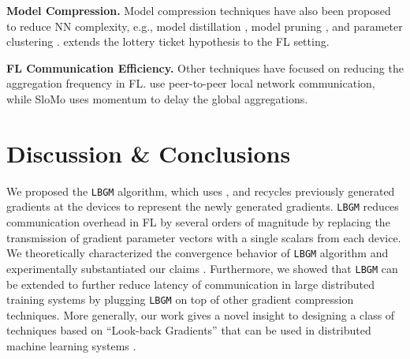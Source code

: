\documentclass{article}
\newcommand{\shams}[1]{{\color{red}{#1}}}
\renewcommand{\shams}[1]{{\color{black}{#1}}}
\newcommand{\algName}{{\tt LBGM}}
\begin{document}
\vspace{-1.2mm}
\textbf{Model Compression.} Model compression techniques have also been proposed to reduce NN complexity, e.g., model distillation \citep{ba2013deep, hinton2015distilling}, model pruning \citep{lecun1990optimal, hinton2015distilling}, 
and parameter clustering
\citep{son2018clustering,cho2021dkm}. 
\citep{li2020lotteryfl} extends the lottery ticket hypothesis to the FL setting. \shams{These methods have the potential to be employed in conjunction with LBGM to reduce the size of the LBGs stored at the server.}

\vspace{-1.2mm}
\textbf{FL Communication Efficiency.} Other techniques have focused on reducing the aggregation frequency in FL. \citet{hosseinalipour2020multi,lin2021two} use peer-to-peer local network communication, while SloMo \citep{wang2019slowmo} uses momentum to delay the global aggregations.



\vspace{-3mm}
\section{Discussion \& Conclusions}
\vspace{-2mm}
\shams{In this paper, we explored the effect of overparameterization in NN optimization through the PCA of the gradient-space, and employed this to optimize the accuracy vs. communication tradeoff in FL.}
We proposed the {\algName} algorithm, which uses \shams{our hypothesis that PGDs can be approximated using a subset of gradients generated across SGD epochs}, and recycles previously generated gradients at the devices to represent the newly generated gradients. {\algName} reduces communication overhead in FL by several orders of magnitude by replacing the transmission of gradient parameter vectors with a single scalars from each device. We theoretically characterized the convergence behavior of {\algName} algorithm and experimentally substantiated our claims \shams{on several datasets and models}. Furthermore, we showed that {\algName} can be extended to further reduce latency of communication in large distributed training systems by plugging {\algName} on top of other gradient compression techniques. More generally, our work gives a novel insight to designing a class of techniques based on ``Look-back Gradients'' that can be used in distributed machine learning systems \shams{to enhance communication savings}.


{\small


}

\newpage



\end{document}
